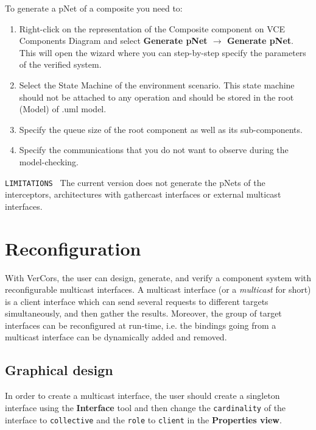 \documentclass[12pt]{article}
\begin{document}

To generate a pNet of a composite you need to:
\begin{enumerate}
\item
Right-click on the representation of the Composite component on VCE Components Diagram and select \textbf{Generate pNet $\rightarrow$ Generate pNet}. This will open the wizard where you can step-by-step specify the parameters of the verified system.
\item
Select the State Machine of the environment scenario. This state machine should not be attached to any operation and should be stored in the root (Model) of .uml model.
\item
Specify the queue size of the root component as well as its sub-components.
\item
Specify the communications that you do not want to observe during the model-checking.
\end{enumerate}

\texttt{LIMITATIONS } The current version does not generate the pNets of the interceptors, architectures with gathercast interfaces or external multicast interfaces.

\section{Reconfiguration}

With VerCors, the user can design, generate, and verify a component system with reconfigurable multicast interfaces.
A multicast interface (or a \textit{multicast} for short) is a client interface which can send several requests to different targets simultaneously, and then gather the results. Moreover, the group of target interfaces can be reconfigured at run-time, i.e. the bindings going from a multicast interface can be dynamically added and removed. 

\subsection{Graphical design}

In order to create a multicast interface, the user should create a singleton interface using the \textbf{Interface} tool and then change the \texttt{cardinality} of the interface to \texttt{collective} and the \texttt{role} to \texttt{client} in the \textbf{Properties view}.
\end{document}
